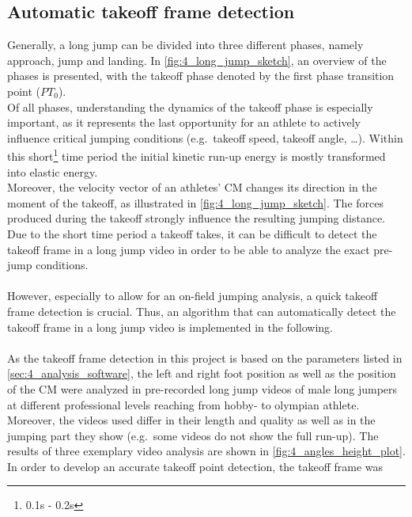\subsection{Automatic takeoff frame detection}\label{subsec:4_takeoff_detection}
Generally, a long jump can be divided into three different phases, namely
approach, jump and landing.
In \autoref{fig:4_long_jump_sketch}, an overview of the phases is presented,
with the takeoff phase denoted by the first phase transition point ($PT_0$).\\
Of all phases, understanding the dynamics of the takeoff phase is especially
important, as it represents the last opportunity for an athlete to actively
influence critical jumping conditions (e.g.\ takeoff speed, takeoff angle,
\dots).
Within this short\footnote{0.1s - 0.2s\cite{mechanical_power_long_jump}} time
period the initial kinetic run-up energy is mostly transformed into elastic
energy\cite{wittersModelElasticTake1992}.\\
Moreover, the velocity vector of an athletes' \ac{CM} changes its direction
in the moment of the takeoff\cite{murakiJointTorquePower2008}, as illustrated in
\autoref{fig:4_long_jump_sketch}.
The forces produced during the takeoff strongly influence the resulting
jumping distance\cite{hayCitiusAltiusLongius1993}.\\
Due to the short time period a takeoff takes, it can be difficult to detect
the takeoff frame in a long jump video in order to be able to analyze the
exact pre-jump conditions.\\\\
However, especially to allow for an on-field jumping analysis, a quick takeoff
frame detection is crucial.
Thus, an algorithm that can automatically detect the takeoff frame in a long
jump video is implemented in the following.\\\\
As the takeoff frame detection in this project is based on the parameters
listed in \autoref{sec:4_analysis_software}, the left and right
foot position as well as the position of the \ac{CM} were analyzed in
pre-recorded long jump videos of male long jumpers at different professional
levels reaching from hobby- to olympian athlete.
Moreover, the videos used differ in their length and quality as well as in the
jumping part they show (e.g.\ some videos do not show the full run-up).
The results of three exemplary video analysis are shown in
\autoref{fig:4_angles_height_plot}.
In order to develop an accurate takeoff point detection, the takeoff frame was
